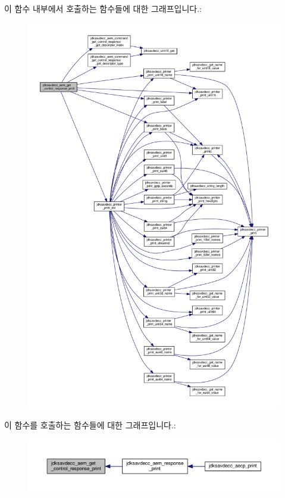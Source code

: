 이 함수 내부에서 호출하는 함수들에 대한 그래프입니다.\+:
\nopagebreak
\begin{figure}[H]
\begin{center}
\leavevmode
\includegraphics[width=350pt]{group__aem__print_gae342e36984fb0fa396b4a2192413e260_cgraph}
\end{center}
\end{figure}




이 함수를 호출하는 함수들에 대한 그래프입니다.\+:
\nopagebreak
\begin{figure}[H]
\begin{center}
\leavevmode
\includegraphics[width=350pt]{group__aem__print_gae342e36984fb0fa396b4a2192413e260_icgraph}
\end{center}
\end{figure}



